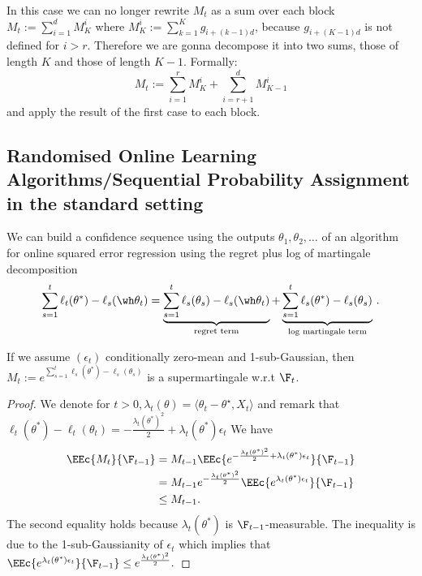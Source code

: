 In this case we can no longer rewrite $M_t$ as a sum over each block $M_t := \sum_{i=1}^d M_K^i$
    where $M_K^i := \sum_{k=1}^K g_{i+(k-1)d}$, because $g_{i+(K-1)d}$ is  not defined for $i>r$. Therefore we are gonna decompose it into two sums, those of length $K$ and those of length $K-1$. Formally:
    $$M_t := \sum_{i=1}^r M_K^i + \sum_{i=r+1}^d M_{K-1}^i$$
    and apply the result of the first case to each block.

\subsection{Randomised Online Learning Algorithms/Sequential Probability Assignment in the standard setting}
\label{sec:ewa}

We can build a confidence sequence using the outputs $\theta_1, \theta_2, \dots$ of an algorithm for online squared error regression using the regret plus log of martingale decomposition
\begin{equation*}
\sum_{s=1}^t\ell_t(\theta^*)-\ell_s(\wh \theta_t) = \underbrace{\sum_{s=1}^t \ell_s(\theta_s)-\ell_s(\wh \theta_t) }_{\text{regret term}}  + \underbrace{\sum_{s=1}^t \ell_s(\theta^*)-\ell_s(\theta_s)}_{\text{log martingale term}}\,.
\end{equation*}
\begin{lemma} If we assume $(\epsilon_t)$ conditionally zero-mean and 1-sub-Gaussian, then
    \label{lemma:Concentration_SMG_classic}
    $M_t:=e^{\sum_{s=1}^t \ell_s(\theta^*)-\ell_s(\theta_s)}$ is a supermartingale w.r.t $\F_t$.
\end{lemma}
\begin{proof}
    We denote for $t>0, \lambda_t(\theta) = \langle \theta_t -\theta^\star, X_t\rangle$ and remark that $\ell_t(\theta^*)-\ell_t(\theta_t) = -\frac{\lambda_t(\theta^*)^2}{2}+\lambda_t(\theta^*)\epsilon_t$ We have 
    \begin{align*}
        \EEc{M_t}{\F_{t-1}}&= M_{t-1}\EEc{e^{-\frac{\lambda_t(\theta^*)^2}{2}+\lambda_t(\theta^*)\epsilon_t}}{\F_{t-1}}\\
        &=M_{t-1}e^{-\frac{\lambda_t(\theta^*)^2}{2}}\EEc{e^{\lambda_t(\theta^*)\epsilon_t}}{\F_{t-1}} \\
        &\leq M_{t-1}.
    \end{align*}
The second equality holds because $\lambda_t(\theta^*)$ is $\F_{t-1}$-measurable. The inequality is due to the 1-sub-Gaussianity of $\epsilon_t$ which implies that $\EEc{e^{\lambda_t(\theta^*)\epsilon_t}}{\F_{t-1}}\leq e^{\frac{\lambda_t(\theta^*)^2}{2}}.$
\end{proof}

